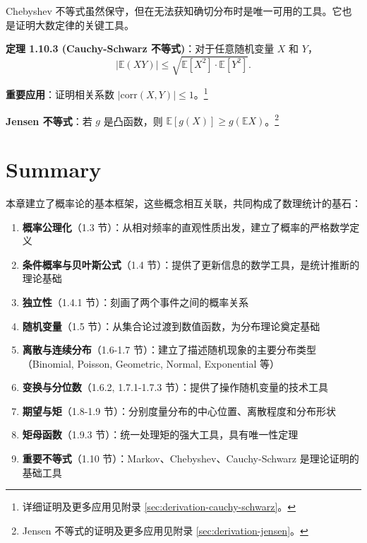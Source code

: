 Chebyshev 不等式虽然保守，但在无法获知确切分布时是唯一可用的工具。它也是证明大数定律的关键工具。

\begin{remark}
\textbf{定理 1.10.3 (Cauchy-Schwarz 不等式)}：对于任意随机变量 $X$ 和 $Y$，
\[
|\mathbb{E}(XY)| \leq \sqrt{\mathbb{E}[X^2] \cdot \mathbb{E}[Y^2]}.
\tag{1.10.3}\label{eq:cauchy-schwarz-ch1}
\]

\textbf{重要应用}：证明相关系数 $|\text{corr}(X,Y)| \leq 1$。\footnote{详细证明及更多应用见附录 \cref{sec:derivation-cauchy-schwarz}。}
\end{remark}

\textbf{Jensen 不等式}：若 $g$ 是凸函数，则 $\mathbb{E}[g(X)] \geq g(\mathbb{E}X)$。\footnote{Jensen 不等式的证明及更多应用见附录 \cref{sec:derivation-jensen}。}

\section*{Summary}\label{sec:chapter1-summary}

本章建立了概率论的基本框架，这些概念相互关联，共同构成了数理统计的基石：

\begin{enumerate}
    \item \textbf{概率公理化}（1.3 节）：从相对频率的直观性质出发，建立了概率的严格数学定义

    \item \textbf{条件概率与贝叶斯公式}（1.4 节）：提供了更新信息的数学工具，是统计推断的理论基础

    \item \textbf{独立性}（1.4.1 节）：刻画了两个事件之间的概率关系

    \item \textbf{随机变量}（1.5 节）：从集合论过渡到数值函数，为分布理论奠定基础

    \item \textbf{离散与连续分布}（1.6-1.7 节）：建立了描述随机现象的主要分布类型（Binomial, Poisson, Geometric, Normal, Exponential 等）

    \item \textbf{变换与分位数}（1.6.2, 1.7.1-1.7.3 节）：提供了操作随机变量的技术工具

    \item \textbf{期望与矩}（1.8-1.9 节）：分别度量分布的中心位置、离散程度和分布形状

    \item \textbf{矩母函数}（1.9.3 节）：统一处理矩的强大工具，具有唯一性定理

    \item \textbf{重要不等式}（1.10 节）：Markov、Chebyshev、Cauchy-Schwarz 是理论证明的基础工具
\end{enumerate}

